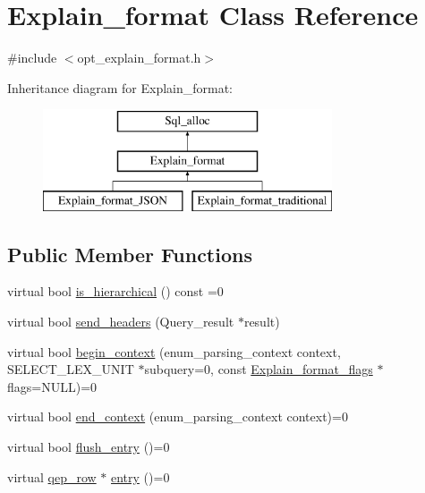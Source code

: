 \hypertarget{classExplain__format}{}\section{Explain\+\_\+format Class Reference}
\label{classExplain__format}


{\ttfamily \#include $<$opt\+\_\+explain\+\_\+format.\+h$>$}

Inheritance diagram for Explain\+\_\+format\+:\begin{figure}[H]
\begin{center}
\leavevmode
\includegraphics[height=3.000000cm]{classExplain__format}
\end{center}
\end{figure}
\subsection*{Public Member Functions}
\begin{DoxyCompactItemize}
\item 
virtual bool \mbox{\hyperlink{classExplain__format_a91ab0cd859549a7df55746df2491ca60}{is\+\_\+hierarchical}} () const =0
\item 
virtual bool \mbox{\hyperlink{classExplain__format_ae4808c82b9c88d94ede33477753917f3}{send\+\_\+headers}} (Query\+\_\+result $\ast$result)
\item 
virtual bool \mbox{\hyperlink{classExplain__format_aedfa1f1b941f522948707e4fa3368f79}{begin\+\_\+context}} (enum\+\_\+parsing\+\_\+context context, S\+E\+L\+E\+C\+T\+\_\+\+L\+E\+X\+\_\+\+U\+N\+IT $\ast$subquery=0, const \mbox{\hyperlink{classExplain__format__flags}{Explain\+\_\+format\+\_\+flags}} $\ast$flags=N\+U\+LL)=0
\item 
virtual bool \mbox{\hyperlink{classExplain__format_a3d668c297dd5fb8ae34b11fe89dfc02b}{end\+\_\+context}} (enum\+\_\+parsing\+\_\+context context)=0
\item 
virtual bool \mbox{\hyperlink{classExplain__format_a3907382576a43a2fa4ed554f5d13e158}{flush\+\_\+entry}} ()=0
\item 
virtual \mbox{\hyperlink{classqep__row}{qep\+\_\+row}} $\ast$ \mbox{\hyperlink{classExplain__format_aa822adf89028df0cdb74d39065ee9e5a}{entry}} ()=0
\end{DoxyCompactItemize}
